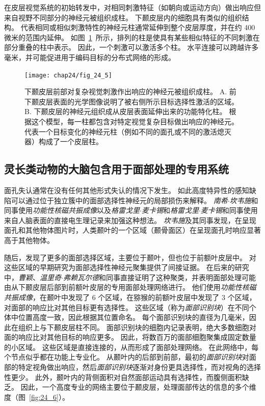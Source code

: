 在皮层视觉系统的初始转发中，对相同刺激特征（如朝向或运动方向）做出响应但来自视野不同部分的神经元被组织成柱。
下颞皮层内的细胞具有类似的组织结构。
代表相同或相似刺激特性的神经元柱通常延伸到整个皮层厚度，并在约 400 微米的范围内延伸。
如图~\ref{fig:24_5}~所示，排列的柱是使具有某些相似特征的不同刺激在部分重叠的柱中表示。
因此，一个刺激可以激活多个柱。
水平连接可以跨越许多毫米，并可能促进用于编码目标的分布式网络的形成。


\begin{figure}[htbp]
	\centering
	\texttt{[image: chap24/fig\_24\_5]}
	\caption{下颞皮层前部对复杂视觉刺激作出响应的神经元被组织成柱。
		A. 前下颞皮层表面的光学图像说明了被右侧所示目标选择性激活的区域。
		B. 下颞皮层的神经元组织成从皮层表面延伸出来的功能特化柱。
		根据这个模型，每一柱都包含对特定视觉复杂目标做出响应的神经元。
		代表一个目标变化的神经元柱（例如不同的面孔或不同的激活熄灭器）构成了一个皮层柱。}
	\label{fig:24_5}
\end{figure}



\subsection{灵长类动物的大脑包含用于面部处理的专用系统}

面孔失认通常在没有任何其他形式失认的情况下发生。
如此高度特异性的感知缺陷可以通过位于独立簇中的面部选择性神经元的局部损伤来解释。
\textit{南希$\cdot$坎韦施}和同事使用\textit{功能性核磁共振成像}\cite{kanwisher1997fusiform}以及\textit{格雷戈里$\cdot$麦卡锡}和\textit{格雷戈里$\cdot$麦卡锡}和同事使用来自人脑表面的直接电生理记录\cite{mccarthy1997face}来加强这种想法。
\textit{坎韦施}及其同事发现，在呈现面孔和其他物体图片时，人类颞叶的一个区域（颞骨面区）在呈现面孔时响应显著高于其他物体。


随后，发现了更多的面部选择区域，主要位于颞叶，但也位于前额叶皮层中。
对这些区域的早期研究为面部选择性神经元聚集提供了间接证据。
在后来的研究中，\textit{曹颖}、\textit{温里奇$\cdot$弗赖瓦尔德}和同事直接证明了这种聚类，并表明面部处理可能由从下颞皮层后部到前额叶皮层的专用面部处理网络进行。
他们使用\textit{功能性核磁共振成像}，在颞叶中发现了 6 个区域，在猕猴的前额叶皮层中发现了 3 个区域，对面部的响应比对其他目标更有选择性。
这些区域（称为\textit{面部识别块}）在不同个体中位置高度一致，因此根据其位置命名。
每个面部识别块的直径为几毫米，因此在组织上与下颞皮层柱不同。
面部识别块的细胞内记录表明，绝大多数细胞对面的响应比对其他目标的响应更多。
因此，将数百万的面部细胞聚集成固定数量的小区域。
这些区域是直接连接的，从而形成了面部处理网络。
在此网络中，每个节点似乎都在功能上专业化。
从颞叶内的后部到前部，最初的\textit{面部识别块}对面部的特定视角做出响应，然后\textit{面部识别块}逐渐对身份更具选择性，而对视角的选择性更少。
此外，颞叶内的背侧面积对自然面部运动具有选择性，而腹侧面积缺乏。
因此，一个高度专业的网络主要位于颞皮层，处理面部传达的信息的多个维度（图~\ref{fig:24_6}）。


